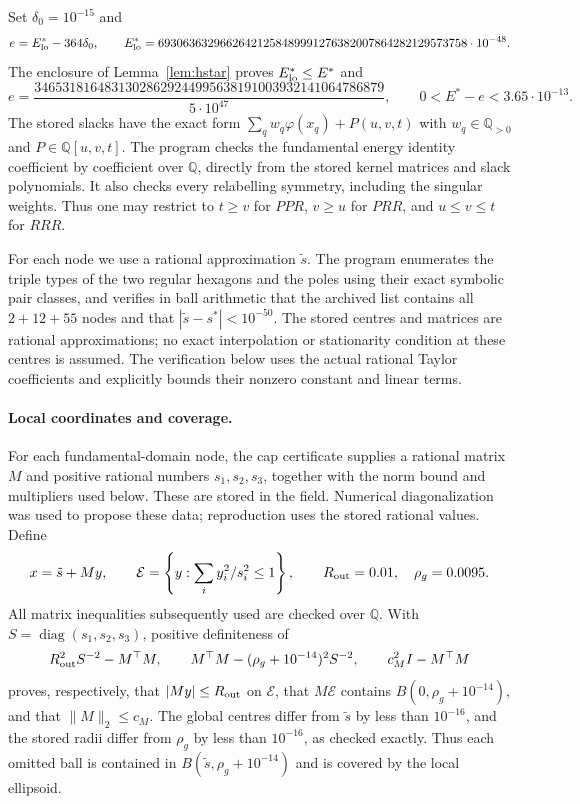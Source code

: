 \documentclass[11pt]{article}
\theoremstyle{definition}
\newcommand{\Q}{\mathbb{Q}}
\newcommand{\Es}{E^{\ast}}
\newcommand{\DELTAZ}{10^{-15}}
\begin{document}
Set $\delta_0=\DELTAZ$ and
\[
 e=\Es_{\rm lo}-364\delta_0,\qquad
 \Es_{\rm lo}=69306363296626421258489991276382007864282129573758\cdot10^{-48}.
\]
The enclosure of Lemma~\ref{lem:hstar} proves $\Es_{\rm lo}\le\Es$ and
\[
 e=\frac{34653181648313028629244995638191003932141064786879}{5\cdot10^{47}},
 \qquad 0<\Es-e<3.65\cdot10^{-13}.
\]
The stored slacks have the exact form $\sum_q w_q\varphi(x_q)+P(u,v,t)$ with $w_q\in\Q_{>0}$ and
$P\in\Q[u,v,t]$. The program  checks the fundamental energy identity
coefficient by coefficient over $\Q$, directly from the stored kernel matrices and slack polynomials.
It also checks every relabelling symmetry, including the singular weights. Thus one may restrict to
$t\ge v$ for $PPR$, $v\ge u$ for $PRR$, and $u\le v\le t$ for $RRR$.

For each node we use a rational approximation $\tilde s$. The program  enumerates the triple
types of the two regular hexagons and the poles using their exact symbolic pair classes, and verifies in ball arithmetic
that the archived list contains all $2+12+55$ nodes and that $|\tilde s-s^\ast|<10^{-50}$.
The stored centres and matrices are rational approximations; no exact interpolation or stationarity
condition at these centres is assumed. The verification below uses the actual rational
Taylor coefficients and explicitly bounds their nonzero constant and linear terms.

\paragraph{Local coordinates and coverage.}
For each fundamental-domain node, the cap certificate supplies a rational matrix $M$ and positive rational
numbers $s_1,s_2,s_3$, together with the norm bound and multipliers used below. These are stored in the
 field. Numerical diagonalization was used to propose these data;
reproduction uses the stored rational values.
Define
\[
 x=\tilde s+My,\qquad
 \mathcal E=\left\{y:\sum_i y_i^2/s_i^2\le1\right\},\qquad
 R_{\rm out}=0.01,\quad \rho_g=0.0095.
\]
All matrix inequalities subsequently used are checked over $\Q$. With $S=\operatorname{diag}(s_1,s_2,s_3)$,
positive definiteness of
\[
 R_{\rm out}^2 S^{-2}-M^\top M,\qquad
 M^\top M-(\rho_g+10^{-14})^2S^{-2},\qquad
 c_M^2 I-M^\top M
\]
proves, respectively, that $|My|\le R_{\rm out}$ on $\mathcal E$, that
$M\mathcal E$ contains $B(0,\rho_g+10^{-14})$, and that $\|M\|_2\le c_M$.
The global centres differ from $\tilde s$ by less than $10^{-16}$, and the stored radii differ from $\rho_g$ by less
than $10^{-16}$, as checked exactly. Thus each omitted ball is contained in
$B(\tilde s,\rho_g+10^{-14})$ and is covered by the local ellipsoid.
\end{document}
